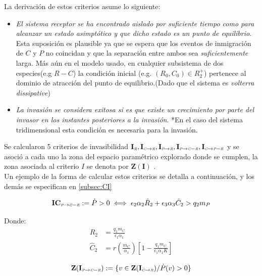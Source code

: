 La derivaci\'on de estos criterios asume lo siguiente:
\begin{itemize}
\item \emph{El sistema receptor se ha encontrado aislado por suficiente tiempo como para alcanzar un estado asimpt\'otico y que dicho estado es un punto de equilibrio}.\\Esta suposici\'on es plausible ya que se espera que los eventos de inmigraci\'on de $C$ y $P$ no coincidan y que la separaci\'on entre ambos sea \emph{suficientemente} larga. M\'as a\'un en el modelo usado, en cualquier subsistema de dos especies(e.g $R-C$) la condici\'on inicial (e.g. $(R_0,C_0) \in R_2^+$) pertenece al dominio de atracci\'on del punto de equilibrio.(Dado que el sistema es \emph{volterra dissipative})
\item \emph{La invasi\'on se considera exitosa si es que existe un crecimiento por parte del invasor en los instantes posteriores a la invasi\'on}. *En el caso del sistema tridimensional esta condici\'on es necesaria para la invasi\'on.
\end{itemize}

Se calcularon 5 criterios de invasibilidad $\mathbf{I_{\textit{\tiny R}},I_{\textit{\tiny C} \to \textit{\tiny R}},I_{\textit{\tiny P} \to \textit{\tiny R}},I_{\textit{\tiny P} \to \textit{\tiny C}-\textit{\tiny R}},I_{\textit{\tiny C} \to \textit{\tiny P}-\textit{\tiny R}}}$ y se asoci\'o a cada uno la zona del espacio param\'etrico explorado donde se cumplen, la zona asociada al criterio $I$ se denota por $\mathbf{Z(I)}$ .\\

Un ejemplo de la forma de calcular estos criterios se detalla a continuaci\'on, y los dem\'as se especifican en \ref{subsec:CI}


\begin{equation} \mathbf{IC_{\textit{\tiny P} \to \textit{\tiny C}-\textit{\tiny R}}} := \dot{P} >0 \iff \epsilon_2\alpha_2\hat{R}_2 + \epsilon_3\alpha_3\hat{C}_2 > q_2 m_P \end{equation}

Donde:
\begin{equation}
\begin{aligned}
\hat{R}_2 &= \frac{q_1 m_C}{\epsilon_1 \alpha_1} \\
\hat{C}_2 &=  r(\frac{m_C}{\alpha_1}) \left[ 1 - \frac{q_1 m_C}{\epsilon_1 \alpha_1 K} \right] 
\end{aligned}
\end{equation}

\begin{equation}
\mathbf{Z(I_{\textit{\tiny P} \to \textit{\tiny C}-\textit{\tiny R}})} := \{ v \in \mathbf{Z(I_{\textit{\tiny C} \to \textit{\tiny R}})} / \dot{P}(v) > 0 \}
\end{equation}


